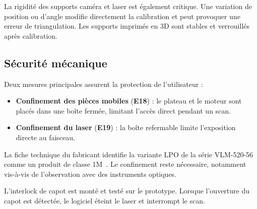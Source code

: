 La rigidité des supports caméra et laser est également critique. Une
variation de position ou d'angle modifie directement la calibration et
peut provoquer une erreur de triangulation. Les supports imprimés en 3D sont
stables et verrouillés après calibration.

\subsection{Sécurité mécanique}

Deux mesures principales assurent la protection de l'utilisateur :

\begin{itemize}
  \item \textbf{Confinement des pièces mobiles} (\textbf{E18}) :
        le plateau et le moteur sont placés dans une boîte fermée,
        limitant l'accès direct pendant un scan.
  \item \textbf{Confinement du laser} (\textbf{E19}) : la boîte
        refermable limite l'exposition directe au faisceau.
\end{itemize}

La fiche technique du fabricant identifie la variante LPO de la série
VLM-520-56 comme un produit de classe 1M~\cite{quarton_vlm52056}. Le
confinement reste nécessaire, notamment vis-à-vis de l'observation avec des
instruments optiques.

L'interlock de capot est monté et testé sur le prototype. Lorsque
l'ouverture du capot est détectée, le logiciel éteint le laser et
interrompt le scan.
